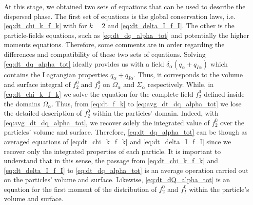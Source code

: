 At this stage, we obtained two sets of equations that can be used to describe the dispersed phase. 
The first set of equations is the global conservation laws, i.e. \ref{eq:dt_chi_k_f_k} with for $k=2$ and \ref{eq:dt_delta_I_f_I}. 
The other is the particle-fields equations, such as \ref{eq:dt_dq_alpha_tot} and potentially the higher moments equations.
Therefore, some comments are in order regarding the differences and compatibility of these two sets of equations.
Solving \ref{eq:dt_dq_alpha_tot} ideally provides us with a field $\delta_\alpha(q_\alpha+q_{I\alpha})$ which contains the Lagrangian properties $q_\alpha+q_{I\alpha}$.
Thus, it corresponds to the volume and surface integral of $f_2^0$ and $f_I^0$ on $\Omega_\alpha$ and $\Sigma_\alpha$ respectively.
While, in \ref{eq:dt_chi_k_f_k} we solve the equation for the complete field $f_2^0$ defined inside the domains $\Omega_\alpha$.  
Thus, from  \ref{eq:dt_f_k} to \ref{eq:avg_dt_dq_alpha_tot} we lose the detailed description of $f_2^0$ within the particles' domain.
Indeed, with \ref{eq:avg_dt_dq_alpha_tot}, we recover solely the integrated value of $f_2^0$ over the particles' volume and surface. 
Therefore, \ref{eq:dt_dq_alpha_tot} can be though as averaged equations of \ref{eq:dt_chi_k_f_k} and \ref{eq:dt_delta_I_f_I} since we recover only the integrated properties of each particle. 
It is important to understand that in this sense, the passage from \ref{eq:dt_chi_k_f_k} and \ref{eq:dt_delta_I_f_I} to \ref{eq:dt_dq_alpha_tot} is an average operation carried out on the particles' volume and surface.
Likewise, \ref{eq:dt_dQ_alpha_tot} is an equation for the first moment of the distribution of $f_2^0$ and $f_I^0$ within the particle's volume and surface.


